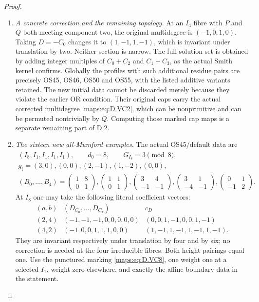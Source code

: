 \begin{proof}
\begin{enumerate}[label=\arabic*.,leftmargin=*]
\item \emph{A concrete correction and the remaining topology.}
At an $I_4$ fibre with $P$ and $Q$ both meeting component
two, the original multidegree is $(-1,0,1,0)$.
Taking $D=-C_0$ changes it to $(1,-1,1,-1)$, which is
invariant under translation by two. Neither section is
narrow. The full solution set is obtained by adding
integer multiples of $C_0+C_2$ and $C_1+C_3$, as the
actual Smith kernel confirms.
Globally the profiles with such additional residue pairs
are precisely OS45, OS46, OS50 and OS55, with the listed
additive variants retained. The new initial data cannot
be discarded merely because they violate the earlier OR
condition. Their original caps carry the actual corrected
multidegree \eqref{maps:eq:D.VC2}, which can be nonprimitive and can
be permuted nontrivially by $Q$. Computing those marked
cap maps is a separate remaining part of D.2.

\item \emph{The sixteen new all-Mumford examples.}
The actual OS45/default data are
\[
 \begin{gathered}
 (I_8,I_1,I_1,I_1,I_1),\qquad d_0=8,\qquad
 \overline G_{I_8}=3\pmod8,\\
 g_i=(3,0),(0,0),(2,-1),(1,-2),(0,0),\\
 (B_0,\ldots,B_4)=\begin{pmatrix}1&8\\0&1\end{pmatrix},
 \begin{pmatrix}1&1\\0&1\end{pmatrix},
 \begin{pmatrix}3&4\\-1&-1\end{pmatrix},
 \begin{pmatrix}3&1\\-4&-1\end{pmatrix},
 \begin{pmatrix}0&1\\-1&2\end{pmatrix}.
 \end{gathered}                                             \tag{D.VC9}\label{maps:eq:D.VC9}
\]
At $I_8$ one may take the following literal coefficient vectors:
\[
\begin{array}{c|c|c}
 (a,b)&(D_{C_0},\ldots,D_{C_7})&c_D\\ \hline
 (2,4)&(-1,-1,-1,0,0,0,0,0)&(0,0,1,-1,0,0,1,-1)\\
 (4,2)&(-1,0,0,1,1,1,0,0)&(1,-1,1,-1,1,-1,1,-1).
\end{array}                                                \tag{D.VC10}\label{maps:eq:D.VC10}
\]
They are invariant respectively under translation by four and by six;
no correction is needed at the four irreducible fibres. Both height
pairings equal one. Use the punctured marking \eqref{maps:eq:D.VC8}, one weight one
at a selected $I_1$, weight zero elsewhere, and exactly the affine
boundary data in the statement.


\end{enumerate}
\end{proof}
